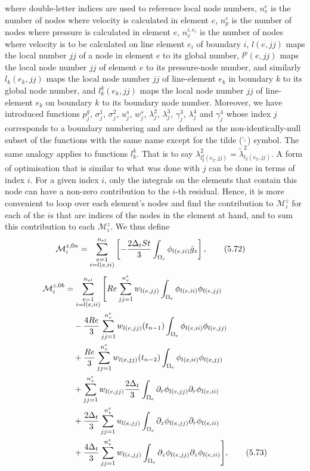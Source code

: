 \documentclass{article}
\begin{document}
where double-letter indices are used to reference local node numbers, $n_v^e$ is the number of nodes where velocity is calculated in element $e$, $n_p^e$ is the number of nodes where pressure is calculated in element $e$, $n_v^{i,e_i}$ is the number of nodes where velocity is to be calculated on line element $e_i$ of boundary $i$, $l(e,jj)$ maps the local number $jj$ of a node in element $e$ to its global number, $l^p(e,jj)$ maps the local node number $jj$ of element $e$ to its pressure-node number, and similarly $l_k(e_k,jj)$ maps the local node number $jj$ of line-element $e_k$ in boundary $k$ to its global node number, and $l_k^k(e_k,jj)$ maps the local node number $jj$ of line-element $e_k$ on boundary $k$ to its boundary node number. Moreover, we have introduced functions $p_j^g$, $\sigma_j^1$, $\sigma_j^2$, $u_j^s$, $w_j^s$, $\lambda_j^2$, $\lambda_j^3$, $\gamma_j^3$, $\lambda_j^4$ and $\gamma_j^4$ whose index $j$ corresponds to a boundary numbering and are defined as the non-identically-null subset of the functions with the same name except for the tilde ($\tilde{\cdot}$) symbol. The same analogy applies to functions $l_k^k$. That is to say $\lambda_{l_2^2(e_2,jj)}^2 = \tilde{\lambda}_{l_2(e_2,jj)}^2$.
A form of optimisation that is similar to what was done with $j$ can be done in terms of index $i$. For a given index $i$, only the integrals on the elements that contain this node can have a non-zero contribution to the $i$-th residual. Hence, it is more convenient to loop over each element's nodes and find the contribution to $\mathcal{M}_i^z$ for each of the $i$s that are indices of the nodes in the element at hand, and to sum this contribution to each $\mathcal{M}_i^z$. We thus define
\begin{align}
\mathcal{M}_i^{z,0a} &= \sum_{\substack{e=1\\ i=l(e,ii)}}^{n_{el}} \left[ -\frac{2\Delta_t St}{3} \int_{\Omega_e} \phi_{l(e,ii)} \hat{g}_z \right], \tag{5.72}
\end{align}
\begin{align}
\mathcal{M}_i^{z,0b} &= \sum_{\substack{e=1\\ i=l(e,ii)}}^{n_{el}} \Bigg[ Re \sum_{jj=1}^{n_v^e} w_{l(e,jj)} \int_{\Omega_e} \phi_{l(e,ii)} \phi_{l(e,jj)} \nonumber\\
&\quad - \frac{4Re}{3} \sum_{jj=1}^{n_v^e} w_{l(e,jj)}(t_{n-1}) \int_{\Omega_e} \phi_{l(e,ii)} \phi_{l(e,jj)} \nonumber\\
&\quad + \frac{Re}{3} \sum_{jj=1}^{n_v^e} w_{l(e,jj)}(t_{n-2}) \int_{\Omega_e} \phi_{l(e,ii)} \phi_{l(e,jj)} \nonumber\\
&\quad + \sum_{jj=1}^{n_v^e} w_{l(e,jj)} \frac{2\Delta_t}{3} \int_{\Omega_e} \partial_r \phi_{l(e,jj)} \partial_r \phi_{l(e,ii)} \nonumber\\
&\quad + \frac{2\Delta_t}{3} \sum_{jj=1}^{n_v^e} u_{l(e,jj)} \int_{\Omega_e} \partial_z \phi_{l(e,jj)} \partial_r \phi_{l(e,ii)} \nonumber\\
&\quad + \frac{4\Delta_t}{3} \sum_{jj=1}^{n_v^e} w_{l(e,jj)} \int_{\Omega_e} \partial_z \phi_{l(e,jj)} \partial_z \phi_{l(e,ii)} \Bigg], \tag{5.73}
\end{align}
\end{document}
